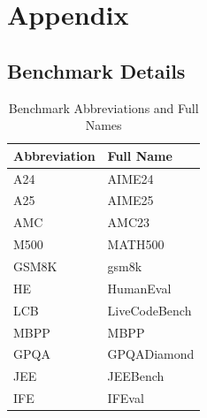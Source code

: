 \section{Appendix}
\subsection{Benchmark Details}
\begin{table}[ht]
\centering
\caption{Benchmark Abbreviations and Full Names}
\label{tab:benchmark_mapping}
\scriptsize
\begin{tabular}{ll}
\toprule
\textbf{Abbreviation} & \textbf{Full Name} \\
\midrule
A24 & AIME24 \\
A25 & AIME25 \\
AMC & AMC23 \\
M500 & MATH500 \\
GSM8K & gsm8k \\
HE & HumanEval \\
LCB & LiveCodeBench \\
MBPP & MBPP \\
GPQA & GPQADiamond \\
JEE & JEEBench \\
IFE & IFEval \\
\bottomrule
\end{tabular}
\end{table}

